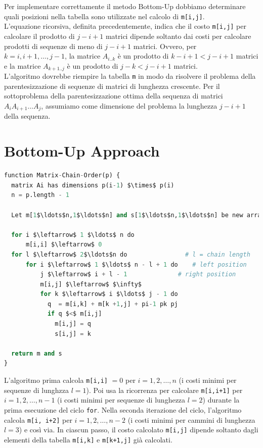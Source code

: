 Per implementare correttamente il metodo Bottom-Up dobbiamo determinare
quali posizioni nella tabella sono utilizzate nel calcolo di
\texttt{m[i,j]}.\\ L'equazione ricorsiva, definita precedentemente,
indica che il costo \texttt{m[i,j]} per calcolare il prodotto di
$j-i+1$ matrici dipende soltanto dai costi per calcolare prodotti di
sequenze di meno di $j-i+1$ matrici. Ovvero, per $k=i,i+1,\ldots,j-1$,
la matrice $A_{i..k}$ è un prodotto di $k-i+1 < j-i+1$ matrici e la
matrice $A_{k+1..j}$ è un prodotto di $j-k < j-i+1$ matrici.\\

L'algoritmo dovrebbe riempire la tabella \texttt{m} in modo da risolvere
il problema della parentesizzazione di sequenze di matrici di lunghezza
crescente. Per il sottoproblema della parentesizzazione ottima della
sequenza di matrici $A_i A_{i+1} \ldots A_j$, assumiamo come dimensione
del problema la lunghezza $j-i+1$ della sequenza.


\section{Bottom-Up Approach}

\begin{lstlisting}[language=Python, mathescape=true]
function Matrix-Chain-Order(p) {
  matrix Ai has dimensions p(i-1) $\times$ p(i)
  n = p.length - 1

  Let m[1$\ldots$n,1$\ldots$n] and s[1$\ldots$n,1$\ldots$n] be new arrays

  for i $\leftarrow$ 1 $\ldots$ n do
	  m[i,i] $\leftarrow$ 0
  for l $\leftarrow$ 2$\ldots$n do                # l = chain length
	  for i $\leftarrow$ 1 $\ldots$ n - l + 1 do    # left position 
		  j $\leftarrow$ i + l - 1              # right position
		  m[i,j] $\leftarrow$ $\infty$
		  for k $\leftarrow$ i $\ldots$ j - 1 do
            q  = m[i,k] + m[k +1,j] + pi-1 pk pj
            if q $<$ m[i,j]
              m[i,j] = q
              s[i,j] = k

  return m and s
}
\end{lstlisting}

L'algoritmo prima calcola \texttt{m[i,i]} $= 0$ per
$i=1, 2,\ldots,n$ (i costi minimi per sequenze di lunghzza $l=1$). Poi
usa la ricorrenza per calcolare \texttt{m{[}i,i+1{]}} per
$i=1,2,\ldots,n-1$ (i costi minimi per sequenze di lunghezza $l=2$)
durante la prima esecuzione del ciclo \texttt{for}. Nella seconda
iterazione del ciclo, l'algoritmo calcola \texttt{m{[}i,\ i+2{]}} per
$i =1,2,\ldots,n-2$ (i costi minimi per cammini di lunghezza $l=3$) e
così via. In ciascun passo, il costo calcolato \texttt{m{[}i,j{]}}
dipende soltanto dagli elementi della tabella \texttt{m{[}i,k{]}} e
\texttt{m{[}k+1,j{]}} già calcolati.


